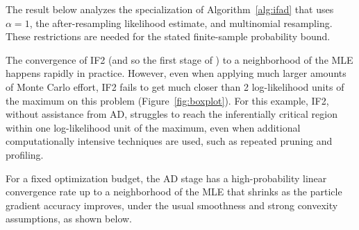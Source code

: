 The result below analyzes the specialization of Algorithm~\ref{alg:ifad} that
uses $\alpha=1$, the after-resampling likelihood estimate, and multinomial
resampling.  These restrictions are needed for the stated finite-sample
probability bound.

The convergence of IF2 (and so the first stage of ) to a neighborhood of the MLE happens rapidly in practice. 
However, even when applying much larger amounts of Monte Carlo effort, IF2 fails to get much closer than 2 log-likelihood units of the maximum on this problem (Figure~\ref{fig:boxplot}).
For this example, IF2, without assistance from AD, struggles to reach the inferentially critical region within one log-likelihood unit of the maximum, even when additional computationally intensive techniques are used, such as repeated pruning and profiling.


For a fixed optimization budget, the AD stage has a high-probability linear
convergence rate up to a neighborhood of the MLE that shrinks as the particle
gradient accuracy improves, under the usual smoothness and strong convexity
assumptions, as shown below.

